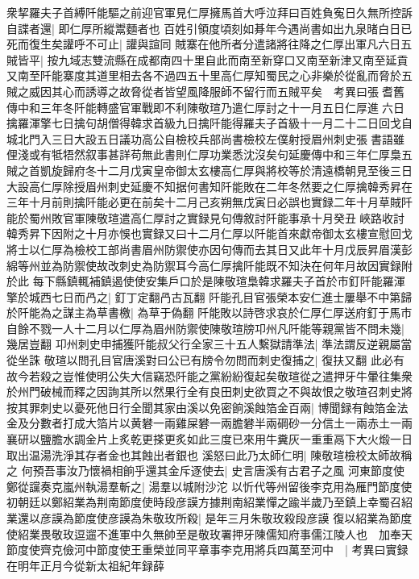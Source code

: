 衆挈羅夫子首縛阡能驅之前迎官軍見仁厚擁馬首大呼泣拜曰百姓負寃日久無所控訴自諜者還|{
	即仁厚所縱鬻麵者也}
百姓引領度頃刻如朞年今遇尚書如出九泉暏白日已死而復生矣讙呼不可止|{
	讙與諠同}
賊寨在他所者分遣諸將往降之仁厚出軍凡六日五賊皆平|{
	按九域志雙流縣在成都南四十里自此而南至新穿口又南至新津又南至延貢又南至阡能寨度其道里相去各不過四五十里高仁厚知蜀民之心非樂於從亂而脅於五賊之威因其心而誘導之故脅從者皆望風降服師不留行而五賊平矣　考異曰張耆舊傳中和三年冬阡能轉盛官軍戰即不利陳敬瑄乃遣仁厚討之十一月五日仁厚進六日擒羅渾擎七日擒句胡僧得韓求首級九日擒阡能得羅夫子首級十一月二十二日回戈自城北門入三日大設五日議功高公自檢校兵部尚書檢校左僕射授眉州刺史張書語雖俚淺或有牴牾然叙事甚詳苟無此書則仁厚功業悉沈沒矣句延慶傳中和三年仁厚梟五賊之首凱旋歸府冬十二月戊寅皇帝御太玄樓高仁厚與將校等於清遠橋朝見至後三日大設高仁厚除授眉州刺史延慶不知据何書知阡能敗在二年冬然要之仁厚擒韓秀昇在三年十月前則擒阡能必更在前矣十二月己亥朔無戊寅日必誤也實録二年十月草賊阡能於蜀州敗官軍陳敬瑄遣高仁厚討之實録見句傳敘討阡能事承十月癸丑峽路收討韓秀昇下因附之十月亦悞也實録又曰十二月仁厚以阡能首來獻帝御太玄樓宣慰回戈將士以仁厚為檢校工部尚書眉州防禦使亦因句傳而去其日又此年十月戊辰昇眉漢彭綿等州並為防禦使故改刺史為防禦耳今高仁厚擒阡能既不知決在何年月故因實録附於此}
每下縣鎮輒補鎮遏使使安集戶口於是陳敬瑄梟韓求羅夫子首於市釘阡能羅渾擎於城西七日而冎之|{
	釘丁定翻冎古瓦翻}
阡能孔目官張榮本安仁進士屢舉不中第歸於阡能為之謀主為草書檄|{
	為草于偽翻}
阡能敗以詩啓求哀於仁厚仁厚送府釘于馬市自餘不戮一人十二月以仁厚為眉州防禦使陳敬瑄牓卭州凡阡能等親黨皆不問未幾|{
	幾居豈翻}
卭州刺史申捕獲阡能叔父行全家三十五人繫獄請準法|{
	準法謂反逆親屬當從坐誅}
敬瑄以問孔目官唐溪對曰公已有牓令勿問而刺史復捕之|{
	復扶又翻}
此必有故今若殺之豈惟使明公失大信竊恐阡能之黨紛紛復起矣敬瑄從之遣押牙牛暈往集衆於州門破械而釋之因詢其所以然果行全有良田刺史欲買之不與故恨之敬瑄召刺史將按其罪刺史以憂死他日行全聞其家由溪以免密餉溪蝕箔金百兩|{
	博聞録有蝕箔金法金及分數者打成大箔片以黄礬一兩雞屎礬一兩膽礬半兩碙砂一分信土一兩赤土一兩襄研以鹽膽水調金片上炙乾更搽更炙如此三度已來用牛糞灰一重重鬲下大火煅一日取出温湯洗淨其存者金也其蝕出者銀也}
溪怒曰此乃太師仁明|{
	陳敬瑄檢校太師故稱之}
何預吾事汝乃懷禍相餉乎還其金斥逐使去|{
	史言唐溪有古君子之風}
河東節度使鄭從讜奏克嵐州執湯羣斬之|{
	湯羣以城附沙沱}
以忻代等州留後李克用為雁門節度使　初朝廷以鄭紹業為荆南節度使時段彦謨方據荆南紹業憚之踰半歲乃至鎮上幸蜀召紹業還以彦謨為節度使彦謨為朱敬玫所殺|{
	是年三月朱敬玫殺段彦謨}
復以紹業為節度使紹業畏敬玫逗遛不進軍中久無帥至是敬玫署押牙陳儒知府事儒江陵人也　加奉天節度使齊克儉河中節度使王重榮並同平章事李克用將兵四萬至河中　|{
	考異曰實録在明年正月今從新太祖紀年録薛}


